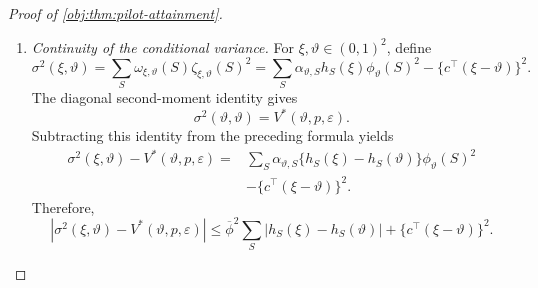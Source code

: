 \documentclass[11pt]{article}
\begin{document}
\begin{proof}[Proof of \cref{obj:thm:pilot-attainment}]
\begin{enumerate}
For \(\xi,\vartheta\in(0,1)^2\), define the main-release probabilities and centered correction by
\[
\omega_{\xi,\vartheta}(S)
=\alpha_{\vartheta,S}h_S(\xi),
\qquad
\zeta_{\xi,\vartheta}(S)
=\phi_\vartheta(S)-c^\top(\xi-\vartheta).
\]
These probabilities are nonnegative and sum to one. Expanding the affine denominator gives
\[
\begin{aligned}
\sum_S\omega_{\xi,\vartheta}(S)\phi_\vartheta(S)
&=\frac1{J_\vartheta}
\left\{
\sum_S\alpha_{\vartheta,S}g_S^\top v(t_\vartheta)
+(\xi-\vartheta)^\top
 I_\vartheta(\alpha_\vartheta)v(t_\vartheta)
\right\}\\
&=c^\top(\xi-\vartheta).
\end{aligned}
\]
At the diagonal,
\[
\sum_S\omega_{\vartheta,\vartheta}(S)\phi_\vartheta(S)^2
=\frac{F_\vartheta(\alpha_\vartheta,t_\vartheta)}{J_\vartheta^2}
=\frac1{J_\vartheta}
=V^*(\vartheta,p,\varepsilon).
\]
In particular,
\[
\sum_S\omega_{\xi,\vartheta}(S)\zeta_{\xi,\vartheta}(S)=0,
\qquad
|\zeta_{\xi,\vartheta}(S)|\le2\overline\phi.
\]
For the last inequality, the exact mean identity and the probability normalization imply
\[
|c^\top(\xi-\vartheta)|
=\left|\sum_S\omega_{\xi,\vartheta}(S)\phi_\vartheta(S)\right|
\le\overline\phi.
\]

\item \emph{Continuity of the conditional variance.}
For \(\xi,\vartheta\in(0,1)^2\), define
\[
\sigma^2(\xi,\vartheta)
=\sum_S\omega_{\xi,\vartheta}(S)\zeta_{\xi,\vartheta}(S)^2
=\sum_S\alpha_{\vartheta,S}h_S(\xi)\phi_\vartheta(S)^2
-\{c^\top(\xi-\vartheta)\}^2.
\]
The diagonal second-moment identity gives
\[
\sigma^2(\vartheta,\vartheta)=V^*(\vartheta,p,\varepsilon).
\]
Subtracting this identity from the preceding formula yields
\[
\begin{aligned}
\sigma^2(\xi,\vartheta)-V^*(\vartheta,p,\varepsilon)
={}&\sum_S\alpha_{\vartheta,S}
\{h_S(\xi)-h_S(\vartheta)\}\phi_\vartheta(S)^2\\
&-\{c^\top(\xi-\vartheta)\}^2.
\end{aligned}
\]
Therefore,
\[
\left|\sigma^2(\xi,\vartheta)-V^*(\vartheta,p,\varepsilon)\right|
\le
\overline\phi^2\sum_S|h_S(\xi)-h_S(\vartheta)|
+\{c^\top(\xi-\vartheta)\}^2.
\]


\end{enumerate}
\end{proof}
\end{document}
